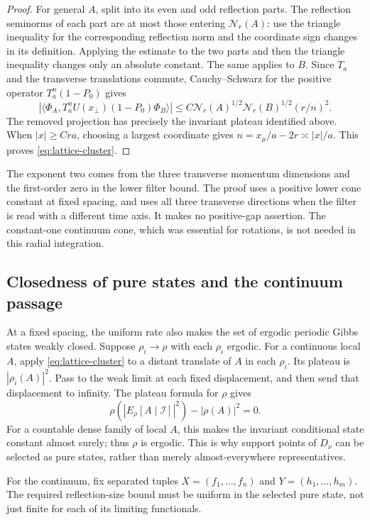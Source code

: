 \documentclass[11pt,letterpaper,reqno]{amsart}
\theoremstyle{definition}
\theoremstyle{remark}
\begin{document}
\begin{proof}
For general $A$, split into its even and odd reflection parts. The
reflection seminorms of each part are at most those entering
$\mathcal N_r(A)$: use the triangle inequality for the corresponding
reflection norm and the coordinate sign changes in its definition.
Applying the estimate to the two parts and then the triangle
inequality changes only an absolute constant. The same applies to $B$.
Since $T_a$ and the transverse translations commute, Cauchy--Schwarz
for the positive operator $T_a^n(1-P_0)$ gives
\[
 |\langle\Phi_A,T_a^nU(x_\perp)(1-P_0)\Phi_B\rangle|
 \le C\mathcal N_r(A)^{1/2}\mathcal N_r(B)^{1/2}(r/n)^2.
\]
The removed projection has precisely the invariant plateau identified
above. When $|x|\ge Cra$, choosing a largest coordinate gives
$n=x_\mu/a-2r\asymp|x|/a$. This proves
\eqref{eq:lattice-cluster}.
\end{proof}

The exponent two comes from the three transverse momentum dimensions
and the first-order zero in the lower filter bound. The proof uses a
positive lower cone constant at fixed spacing, and uses all three
transverse directions when the filter is read with a different time
axis. It makes no positive-gap assertion. The constant-one continuum
cone, which was essential for rotations, is not needed in this radial
integration.


\subsection{Closedness of pure states and the continuum passage}


At a fixed spacing, the uniform rate also makes the set of ergodic
periodic Gibbs states weakly closed. Suppose $\rho_i\to\rho$ with
each $\rho_i$ ergodic. For a continuous local $A$, apply
\eqref{eq:lattice-cluster} to a distant translate of $A$ in each
$\rho_i$. Its plateau is $|\rho_i(A)|^2$. Pass to the weak limit
at each fixed displacement, and then send that displacement to
infinity. The plateau formula for $\rho$ gives
\[
 \rho(|E_\rho[A\mid\mathcal I]|^2)-|\rho(A)|^2=0.
\]
For a countable dense family of local $A$, this makes the invariant
conditional state constant almost surely; thus $\rho$ is ergodic.
This is why support points of $D_\nu$ can be selected as pure
states, rather than merely almost-everywhere representatives.

For the continuum, fix separated tuples
\(X=(f_1,\ldots,f_n)\) and \(Y=(h_1,\ldots,h_m)\).
The required reflection-size bound must be uniform
in the selected pure state, not just finite for
each of its limiting functionals.
\end{document}
